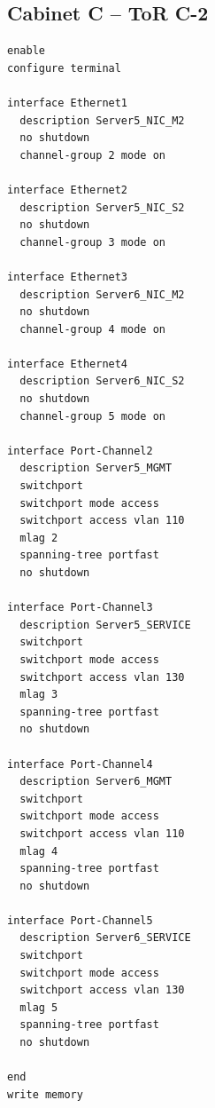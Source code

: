 \subsection{Cabinet C -- ToR C-2}
\begin{lstlisting}[caption={ToR C-2: downlinks to Servers 5 and 6 (backup NICs).},basicstyle=\ttfamily\footnotesize,breaklines=true]
enable
configure terminal

interface Ethernet1
  description Server5_NIC_M2
  no shutdown
  channel-group 2 mode on

interface Ethernet2
  description Server5_NIC_S2
  no shutdown
  channel-group 3 mode on

interface Ethernet3
  description Server6_NIC_M2
  no shutdown
  channel-group 4 mode on

interface Ethernet4
  description Server6_NIC_S2
  no shutdown
  channel-group 5 mode on

interface Port-Channel2
  description Server5_MGMT
  switchport
  switchport mode access
  switchport access vlan 110
  mlag 2
  spanning-tree portfast
  no shutdown

interface Port-Channel3
  description Server5_SERVICE
  switchport
  switchport mode access
  switchport access vlan 130
  mlag 3
  spanning-tree portfast
  no shutdown

interface Port-Channel4
  description Server6_MGMT
  switchport
  switchport mode access
  switchport access vlan 110
  mlag 4
  spanning-tree portfast
  no shutdown

interface Port-Channel5
  description Server6_SERVICE
  switchport
  switchport mode access
  switchport access vlan 130
  mlag 5
  spanning-tree portfast
  no shutdown

end
write memory
\end{lstlisting}

